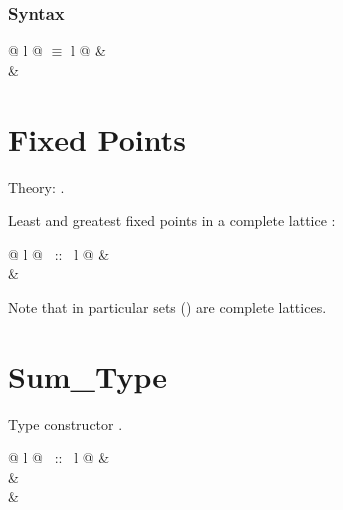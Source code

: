 \begin{isabellebody}
\begin{isamarkuptext}
\subsubsection*{Syntax}

\begin{tabular}{@ {} l @ {\quad$\equiv$\quad} l @ {}}
 & \\
 & \\
\end{tabular}


\section{Fixed Points}

Theory: .

Least and greatest fixed points in a complete lattice :

\begin{tabular}{@ {} l @ {~::~} l @ {}}
 & \\
 & \\
\end{tabular}

Note that in particular sets () are complete lattices.

\section{Sum\_Type}

Type constructor \isa{{\isacharplus}}.

\begin{tabular}{@ {} l @ {~::~} l @ {}}
 & \\
 & \\
 & 
\end{tabular}



\end{isamarkuptext}
\end{isabellebody}
